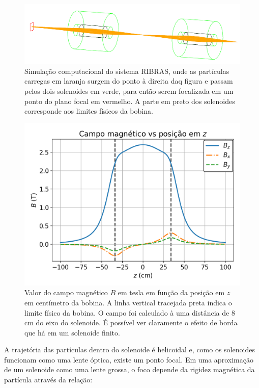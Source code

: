 \documentclass[a4paper,12pt,oneside]{book}
\begin{document}
\begin{figure}[H]
    \centering
    \includegraphics[scale = 0.95]{figs/Foco2S.png}
    \caption{Simulação computacional do sistema RIBRAS, onde as partículas carregas em laranja surgem do ponto à direita daq figura e passam pelos dois solenoides em verde, para então serem focalizada em um ponto do plano focal em vermelho. A parte em preto dos solenoides corresponde aos limites físicos da bobina\cite{ribras_leo}.}
    \label{fig:sim_ribras}
\end{figure}

\begin{figure}[H]
    \centering
    \includegraphics[scale = 0.85]{figs/Campo_mag.png}
    \caption{Valor do campo magnético $B$ em tesla em função da posição em $z$ em centímetro da bobina. A linha vertical tracejada preta indica o limite físico da bobina. O campo foi calculado à uma distância de 8 cm do eixo do solenoide. É possível ver claramente o efeito de borda que há em um solenoide finito\cite{magnetic_field}.}
    \label{fig:campo_mag}
\end{figure}

\par A trajetória das partículas dentro do solenoide é helicoidal e, como os solenoides funcionam como uma lente óptica, existe um ponto focal. Em uma aproximação de um solenoide como uma lente grossa, o foco depende da rigidez magnética da partícula através da relação\cite{KOLATA1989503, zamora_mater}:
\end{document}
